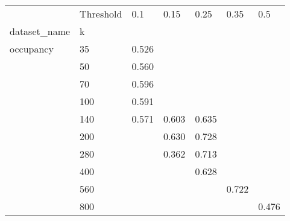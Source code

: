 \begin{tabular}{lllllll}
\toprule
          & Threshold &    0.1 &   0.15 &   0.25 &   0.35 &    0.5 \\
dataset_name & k &        &        &        &        &        \\
\midrule
occupancy & 35  &  0.526 &        &        &        &        \\
          & 50  &  0.560 &        &        &        &        \\
          & 70  &  0.596 &        &        &        &        \\
          & 100 &  0.591 &        &        &        &        \\
          & 140 &  0.571 &  0.603 &  0.635 &        &        \\
          & 200 &        &  0.630 &  0.728 &        &        \\
          & 280 &        &  0.362 &  0.713 &        &        \\
          & 400 &        &        &  0.628 &        &        \\
          & 560 &        &        &        &  0.722 &        \\
          & 800 &        &        &        &        &  0.476 \\
\bottomrule
\end{tabular}
